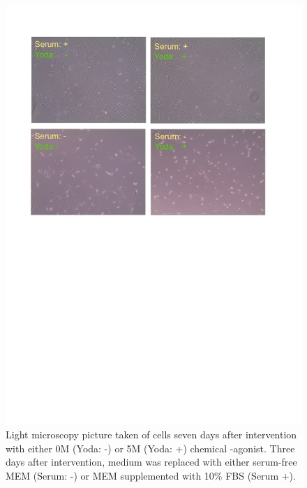 \begin{figure}[ht]
	\centering
	\includegraphics[width = \linewidth{}]{LongTerm_CellPicture.png}
	\caption{
		Light microscopy picture taken of cells seven days after intervention with either 0\textmu{}M (Yoda: -) or 5\textmu{}M (Yoda: +) chemical \Piezo{}-agonist. Three days after intervention, medium was replaced with either serum-free MEM\textalpha{} (Serum: -) or MEM\textalpha{} supplemented with 10\% FBS (Serum +).}
	\label{pic:Cells_LongTerm}
\end{figure}

